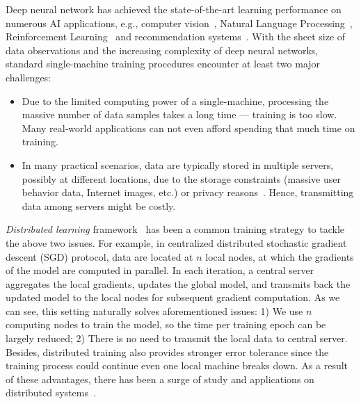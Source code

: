 \documentclass[11pt]{article}
\begin{document}
Deep neural network has achieved the state-of-the-art learning performance on numerous AI applications, e.g., computer vision~\cite{Proc:GAN_NIPS14,Proc:Resnet_CVPR16,CV_review18}, Natural Language Processing~\cite{Proc:Graves_ICASSP13,NLP_review18,sentiment_review18}, Reinforcement Learning~\cite{Arxiv:MnihKSGAWR13,AlphaGo_17} and recommendation systems~\cite{Proc:Covington_2016,Article:Wei_2017}. 
With the sheet size of data observations and the increasing complexity of deep neural networks, standard single-machine training procedures encounter at least two major challenges:
\begin{itemize}
    \item Due to the limited computing power of a single-machine, processing the massive number of data samples takes a long time --- training is too slow. Many real-world applications can not even afford spending that much time on training.
  
    \item In many practical scenarios, data are typically stored in multiple servers, possibly at different locations, due to the storage constraints (massive user behavior data, Internet images, etc.) or privacy reasons~\cite{Proc:Chang18}. 
    Hence, transmitting data among servers might be costly.
\end{itemize}
\textit{Distributed learning} framework~\cite{Proc:Dean_NIPS12} has been a common training strategy to tackle the above two issues. For example, in centralized distributed stochastic gradient descent (SGD) protocol, data are located at $n$ local nodes, at which the gradients of the model are computed in parallel. In each iteration, a central server aggregates the local gradients, updates the global model, and transmits back the updated model to the local nodes for subsequent gradient computation. As we can see, this setting naturally solves aforementioned issues: 1) We use $n$ computing nodes to train the model, so the time per training epoch can be largely reduced; 2) There is no need to transmit the local data to central server. Besides, distributed training also provides stronger error tolerance since the training process could continue even one local machine breaks down. As a result of these advantages, there has been a surge of study and applications on distributed systems~\cite{boyd2011distributed,nedic2009distributed,duchi2011dual,Arxiv:Goyal17,hong2017prox,lu2019gnsd,koloskova2019decentralized}.
\end{document}

